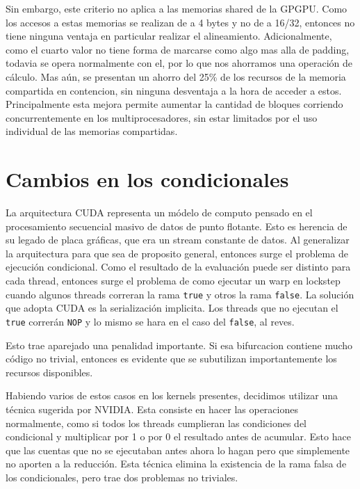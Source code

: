 Sin embargo, este criterio no aplica a las memorias shared de la GPGPU. Como los accesos
a estas memorias se realizan de a 4 bytes y no de a 16/32, entonces no tiene ninguna ventaja
en particular realizar el alineamiento. Adicionalmente, como el cuarto valor no tiene forma de marcarse
como algo mas alla de padding, todavia se opera normalmente con el, por lo que nos ahorramos una
operaci\'on de c\'alculo. Mas a\'un, se presentan un ahorro del 25\% de los recursos de la memoria compartida
en contencion, sin ninguna desventaja a la hora de acceder a estos. Principalmente
esta mejora permite aumentar la cantidad de bloques corriendo concurrentemente en los multiprocesadores,
sin estar limitados por el uso individual de las memorias compartidas.

\section{Cambios en los condicionales}
La arquitectura CUDA representa un m\'odelo de computo pensado en el procesamiento secuencial masivo
de datos de punto flotante. Esto es herencia de su legado de placa gr\'aficas, que era un stream
constante de datos. Al generalizar la arquitectura para que sea de proposito general, entonces
surge el problema de ejecuci\'on condicional. Como el resultado de la evaluaci\'on puede ser distinto
para cada thread, entonces surge el problema de como ejecutar un warp en lockstep cuando algunos threads
correran la rama \texttt{true} y otros la rama \texttt{false}. La soluci\'on que adopta CUDA es la
serializaci\'on implicita. Los threads que no ejecutan el \texttt{true} correr\'an \texttt{NOP}
y lo mismo se hara en el caso del \texttt{false}, al reves.

Esto trae aparejado una penalidad importante. Si esa bifurcacion contiene mucho c\'odigo no trivial,
entonces es evidente que se subutilizan importantemente los recursos disponibles.

Habiendo varios de estos casos en los kernels presentes, decidimos utilizar una t\'ecnica sugerida
por NVIDIA. Esta consiste en hacer las operaciones normalmente, como si todos los threads cumplieran
las condiciones del condicional y multiplicar por 1 o por 0 el resultado antes de acumular.
Esto hace que las cuentas que no se ejecutaban antes ahora lo hagan pero que simplemente no aporten
a la reducci\'on. Esta t\'ecnica elimina la existencia de la rama falsa de los condicionales, pero
trae dos problemas no triviales.

